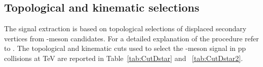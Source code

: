 

  
  

\subsection{Topological and kinematic selections}

The \Dstar signal extraction is based on topological selections of displaced secondary vertices from \Dzero -meson candidates. For a detailed explanation of the procedure refer to \cite{Adam:2015sza}. The topological and kinematic cuts used to select the \Dstar -meson signal in pp collisions at  TeV are reported in Table~\ref{tab:CutDstar} and ~\ref{tab:CutDstar2}.



